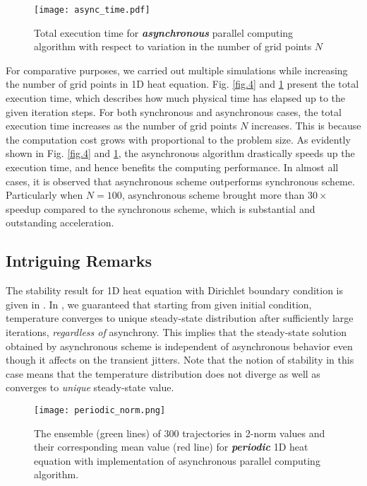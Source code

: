 \documentclass[1p]{elsarticle}
\begin{document}
\begin{figure}
\centering
\texttt{[image: async\_time.pdf]}\vspace{-0.3in}
\caption{Total execution time for \textbf{\textit{asynchronous}} parallel computing algorithm with respect to variation in the number of grid points $N$}\label{fig.5}
\end{figure}

For comparative purposes, we carried out multiple simulations while increasing the number of grid points in 1D heat equation. Fig. \ref{fig.4} and \ref{fig.5} present the total execution time, which describes how much physical time has elapsed up to the given iteration steps. For both synchronous and asynchronous cases, the total execution time increases as the number of grid points $N$ increases. This is because the computation cost grows with proportional to the problem size. 
As evidently shown in Fig. \ref{fig.4} and \ref{fig.5}, the asynchronous algorithm drastically speeds up the execution time, and hence benefits the computing performance. In almost all cases, it is observed that asynchronous scheme outperforms synchronous scheme. Particularly when $N=100$, asynchronous scheme brought more than $30\times$ speedup compared to the synchronous scheme, which is substantial and outstanding acceleration.


\subsection{Intriguing Remarks}
The stability result for 1D heat equation with Dirichlet boundary condition is given in \citep{lee2015async}. In \citep{lee2015async}, we guaranteed that starting from given initial condition, temperature converges to unique steady-state distribution after sufficiently large iterations, \textit{regardless of} asynchrony. This implies that the steady-state solution obtained by asynchronous scheme is independent of asynchronous behavior even though it affects on the transient jitters. Note that the notion of stability in this case means that the temperature distribution does not diverge as well as converges to \textit{unique} steady-state value. 

\begin{figure}
\centering
\texttt{[image: periodic\_norm.png]}
\caption{The ensemble (green lines) of $300$ trajectories in 2-norm values and their corresponding mean value (red line) for \textit{\textbf{periodic}} 1D heat equation with implementation of asynchronous parallel computing algorithm.}\label{fig.6}
\end{figure}
\end{document}
